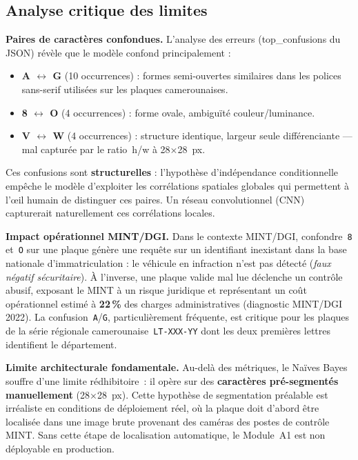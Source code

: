 \subsection{Analyse critique des limites}

\textbf{Paires de caractères confondues.}
L'analyse des erreurs (top\_confusions du JSON) révèle que le modèle confond
principalement :

\begin{itemize}
  \item \textbf{A $\leftrightarrow$ G} (10 occurrences) : formes semi-ouvertes similaires
    dans les polices sans-serif utilisées sur les plaques camerounaises.
  \item \textbf{8 $\leftrightarrow$ O} (4 occurrences) : forme ovale, ambiguïté couleur/luminance.
  \item \textbf{V $\leftrightarrow$ W} (4 occurrences) : structure identique, largeur seule
    différenciante — mal capturée par le ratio~h/w à 28×28~px.
\end{itemize}

Ces confusions sont \textbf{structurelles} : l'hypothèse d'indépendance
conditionnelle empêche le modèle d'exploiter les corrélations spatiales
globales qui permettent à l'œil humain de distinguer ces paires. Un réseau
convolutionnel (CNN) capturerait naturellement ces corrélations locales.

\medskip
\textbf{Impact opérationnel MINT/DGI.}
Dans le contexte MINT/DGI, confondre~\texttt{8} et~\texttt{O} sur une plaque
génère une requête sur un identifiant inexistant dans la base nationale
d'immatriculation : le véhicule en infraction n'est pas détecté
(\textit{faux négatif sécuritaire}). À l'inverse, une plaque valide mal lue
déclenche un contrôle abusif, exposant le MINT à un risque juridique et
représentant un coût opérationnel estimé à \textbf{22\,\%} des charges
administratives (diagnostic MINT/DGI 2022). La confusion~\texttt{A}/\texttt{G},
particulièrement fréquente, est critique pour les plaques de la série
régionale camerounaise~\texttt{LT-XXX-YY} dont les deux premières lettres
identifient le département.

\medskip
\textbf{Limite architecturale fondamentale.}
Au-delà des métriques, le Naïves Bayes souffre d'une limite rédhibitoire~:
il opère sur des \textbf{caractères pré-segmentés manuellement} (28×28~px).
Cette hypothèse de segmentation préalable est irréaliste en conditions de
déploiement réel, où la plaque doit d'abord être localisée dans une image
brute provenant des caméras des postes de contrôle MINT. Sans cette étape
de localisation automatique, le Module~A1 est non déployable en production.

